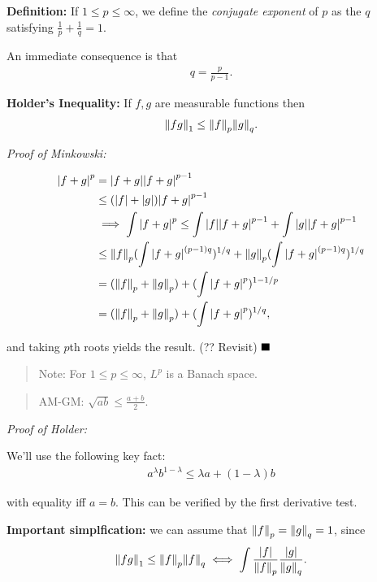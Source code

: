 \textbf{Definition:} If \(1 \leq p \leq \infty\), we define the
\emph{conjugate exponent} of \(p\) as the \(q\) satisfying
\(\frac 1 p + \frac 1 q = 1\).

An immediate consequence is that
\begin{align*}
q = \frac{p}{p-1}
.\end{align*}

\textbf{Holder's Inequality:} If \(f, g\) are measurable functions then
\begin{align*}
{\left\lVert {fg} \right\rVert}_1 \leq {\left\lVert {f} \right\rVert}_p {\left\lVert {g} \right\rVert}_q.
\end{align*}

\emph{Proof of Minkowski:}

\begin{align*}
{\left\lvert {f + g} \right\rvert}^p 
&= {\left\lvert {f+g} \right\rvert} {\left\lvert {f+g} \right\rvert}^{p-1} \\
&\leq ( {\left\lvert {f} \right\rvert} + {\left\lvert {g} \right\rvert} ) {\left\lvert {f+g} \right\rvert}^{p-1} \\
&\implies \int {\left\lvert {f+g} \right\rvert}^p \leq \int {\left\lvert {f} \right\rvert} {\left\lvert {f+g} \right\rvert}^{p-1} + \int {\left\lvert {g} \right\rvert} {\left\lvert {f + g} \right\rvert}^{p-1} \\
&\leq {\left\lVert {f} \right\rVert}_p ( \int {\left\lvert {f+g} \right\rvert}^{(p-1)q}  )^{1/q}
+ {\left\lVert {g} \right\rVert}_p ( \int {\left\lvert {f+g} \right\rvert}^{(p-1)q}  )^{1/q} \\
&= ({\left\lVert {f} \right\rVert}_p + {\left\lVert {g} \right\rVert}_p) + ( \int{\left\lvert {f+g} \right\rvert}^p )^{1 - 1/p} \\
&= ({\left\lVert {f} \right\rVert}_p + {\left\lVert {g} \right\rVert}_p) + ( \int{\left\lvert {f+g} \right\rvert}^p )^{1/q}
,\end{align*}

and taking \(p\)th roots yields the result. (?? Revisit) \(\qed\)

\begin{quote}
Note: For \(1\leq p \leq \infty\), \(L^p\) is a Banach space.
\end{quote}

\begin{quote}
AM-GM: \(\sqrt{ab} \leq \frac{a+b}{2}\).
\end{quote}

\emph{Proof of Holder:}

We'll use the following key fact:
\begin{align*}
a^\lambda b^{1-\lambda} \leq \lambda a + (1-\lambda)b
\end{align*}

with equality iff \(a=b\). This can be verified by the first derivative
test.

\textbf{Important simplfication:} we can assume that
\({\left\lVert {f} \right\rVert}_p = {\left\lVert {g} \right\rVert}_q = 1\), since
\begin{align*}
{\left\lVert {fg} \right\rVert}_1 \leq {\left\lVert {f} \right\rVert}_p {\left\lVert {f} \right\rVert}_q \iff \int \frac{{\left\lvert {f} \right\rvert}}{{\left\lVert {f} \right\rVert}_p} \frac{{\left\lvert {g} \right\rvert}}{{\left\lVert {g} \right\rVert}_q}
.\end{align*}

